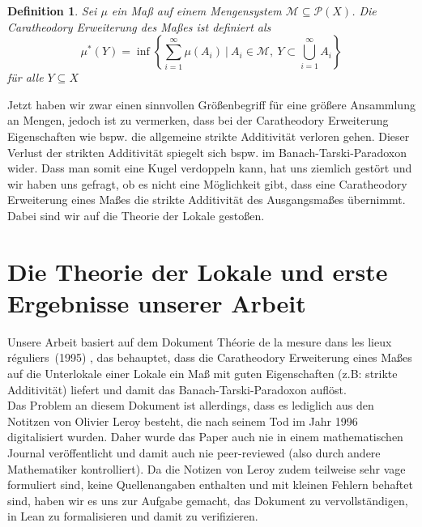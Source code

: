 \documentclass[hidelinks]{article}
\newtheorem{definition}[satz]{Definition}
\begin{document}
    \begin{definition}
        Sei $\mu$ ein Maß auf einem Mengensystem $\mathcal{M} \subseteq \mathcal P(X)$. Die Caratheodory Erweiterung des Maßes ist definiert als
        \[\mu^*(Y)=\inf \left\{ \sum_{i=1}^\infty \mu(A_i)~|~A_i\in\mathcal{M},~Y\subset\bigcup_{i=1}^\infty A_i \right\}\] für alle $Y \subseteq X$
    \end{definition}

    Jetzt haben wir zwar einen sinnvollen Größenbegriff für eine größere Ansammlung an Mengen, jedoch ist zu vermerken, dass bei der Caratheodory Erweiterung Eigenschaften wie bspw. die allgemeine strikte Additivität verloren gehen. Dieser Verlust der strikten Additivität spiegelt sich bspw. im Banach-Tarski-Paradoxon wider.
    Dass man somit eine Kugel verdoppeln kann, hat uns ziemlich gestört und wir haben uns gefragt, ob es nicht eine Möglichkeit gibt, dass eine Caratheodory Erweiterung eines Maßes die strikte Additivität des Ausgangsmaßes übernimmt.
    Dabei sind wir auf die Theorie der Lokale gestoßen.

    \section{Die Theorie der Lokale und erste Ergebnisse unserer Arbeit}
    \noindent Unsere Arbeit basiert auf dem Dokument \glqq Théorie de la mesure dans les lieux réguliers\grqq~(1995) \autocite{leroy_theorie_2013}, das behauptet, dass die Caratheodory Erweiterung eines Maßes auf die Unterlokale einer Lokale ein Maß mit guten Eigenschaften (z.B: strikte Additivität) liefert und damit das Banach-Tarski-Paradoxon auflöst.\\
    \noindent Das Problem an diesem Dokument ist allerdings, dass es lediglich aus den Notitzen von Olivier Leroy besteht,
    die nach seinem Tod im Jahr 1996 digitalisiert wurden.
    Daher wurde das Paper auch nie in einem mathematischen Journal veröffentlicht und damit auch nie peer-reviewed (also durch andere Mathematiker kontrolliert).
    Da die Notizen von Leroy zudem teilweise sehr vage formuliert sind, keine Quellenangaben enthalten und mit kleinen
    Fehlern behaftet sind, haben wir es uns zur Aufgabe gemacht, das Dokument zu vervollständigen, in Lean zu formalisieren und damit zu
    verifizieren.
        
\end{document}
